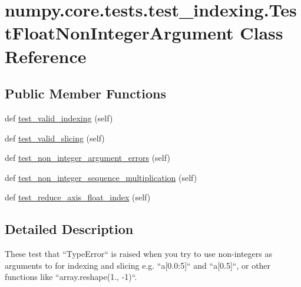 \hypertarget{classnumpy_1_1core_1_1tests_1_1test__indexing_1_1TestFloatNonIntegerArgument}{}\section{numpy.\+core.\+tests.\+test\+\_\+indexing.\+Test\+Float\+Non\+Integer\+Argument Class Reference}
\label{classnumpy_1_1core_1_1tests_1_1test__indexing_1_1TestFloatNonIntegerArgument}
\subsection*{Public Member Functions}
\begin{DoxyCompactItemize}
\item 
def \hyperlink{classnumpy_1_1core_1_1tests_1_1test__indexing_1_1TestFloatNonIntegerArgument_a202c053dc8bdc653be0bc4f4d151763e}{test\+\_\+valid\+\_\+indexing} (self)
\item 
def \hyperlink{classnumpy_1_1core_1_1tests_1_1test__indexing_1_1TestFloatNonIntegerArgument_a4ec9ed024699e903d472d53fe143200c}{test\+\_\+valid\+\_\+slicing} (self)
\item 
def \hyperlink{classnumpy_1_1core_1_1tests_1_1test__indexing_1_1TestFloatNonIntegerArgument_a4ac60f86d036df7a40031c7fbd8b8dc4}{test\+\_\+non\+\_\+integer\+\_\+argument\+\_\+errors} (self)
\item 
def \hyperlink{classnumpy_1_1core_1_1tests_1_1test__indexing_1_1TestFloatNonIntegerArgument_a14bf4656bdc9013cfa7eff16b5709ddb}{test\+\_\+non\+\_\+integer\+\_\+sequence\+\_\+multiplication} (self)
\item 
def \hyperlink{classnumpy_1_1core_1_1tests_1_1test__indexing_1_1TestFloatNonIntegerArgument_aca1649e679ada0e6b261be9e886a0810}{test\+\_\+reduce\+\_\+axis\+\_\+float\+\_\+index} (self)
\end{DoxyCompactItemize}


\subsection{Detailed Description}
\begin{DoxyVerb}These test that ``TypeError`` is raised when you try to use
non-integers as arguments to for indexing and slicing e.g. ``a[0.0:5]``
and ``a[0.5]``, or other functions like ``array.reshape(1., -1)``.\end{DoxyVerb}
 


